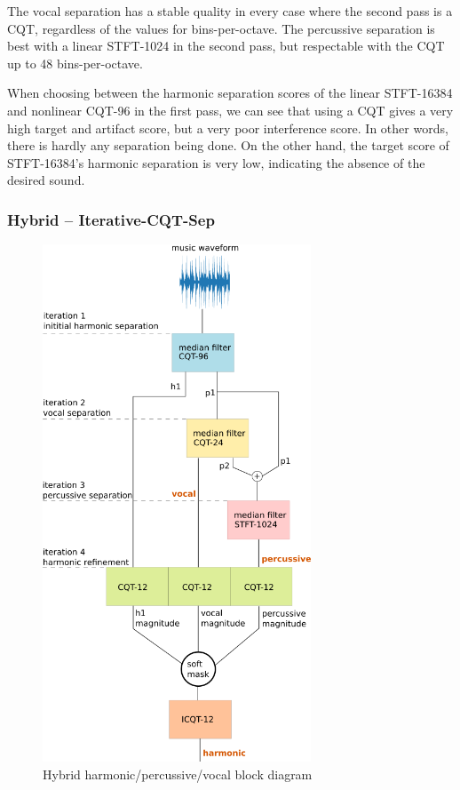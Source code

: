 \documentclass[letter,12pt]{article}
\begin{document}
The vocal separation has a stable quality in every case where the second pass is a CQT, regardless of the values for bins-per-octave. The percussive separation is best with a linear STFT-1024 in the second pass, but respectable with the CQT up to 48 bins-per-octave.

When choosing between the harmonic separation scores of the linear STFT-16384 and nonlinear CQT-96 in the first pass, we can see that using a CQT gives a very high target and artifact score, but a very poor interference score. In other words, there is hardly any separation being done. On the other hand, the target score of STFT-16384's harmonic separation is very low, indicating the absence of the desired sound.

\vfill
\clearpage %

\subsubsection{Hybrid -- Iterative-CQT-Sep}

\begin{figure}
	\includegraphics[width=8cm]{./hybrid_vocal_block_diagram.png}
	\caption{Hybrid harmonic/percussive/vocal block diagram}
	\label{fig:hybridvocal}
\end{figure}
\end{document}
